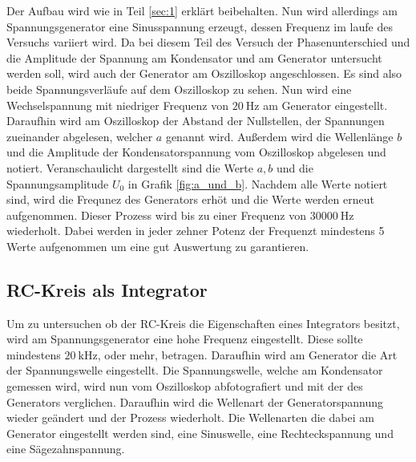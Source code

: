 Der Aufbau wird wie in Teil \ref{sec:1} erklärt beibehalten.
Nun wird allerdings am Spannungsgenerator eine Sinusspannung erzeugt, dessen Frequenz im laufe des Versuchs variiert wird.
Da bei diesem Teil des Versuch der Phasenunterschied und die Amplitude der Spannung am Kondensator und am Generator untersucht werden soll, wird auch der Generator am Oszilloskop angeschlossen.
Es sind also beide Spannungsverläufe auf dem Oszilloskop zu sehen.
Nun wird eine Wechselspannung mit niedriger Frequenz von $\SI{20}{\hertz}$ am Generator eingestellt.
Daraufhin wird am Oszilloskop der Abstand der Nullstellen, der Spannungen zueinander abgelesen, welcher $a$ genannt wird.
Außerdem wird die Wellenlänge $b$ und die Amplitude der Kondensatorspannung vom Oszilloskop abgelesen und notiert.
Veranschaulicht dargestellt sind die Werte $a, b$ und die Spannungsamplitude $U_0$ in Grafik \ref{fig:a_und_b}.
Nachdem alle Werte notiert sind, wird die Frequnez des Generators erhöt und die Werte werden erneut aufgenommen.
Dieser Prozess wird bis zu einer Frequenz von $\SI{30000}{\hertz}$ wiederholt. 
Dabei werden in jeder zehner Potenz der Frequenzt mindestens 5 Werte aufgenommen um eine gut Auswertung zu garantieren.


\subsection{RC-Kreis als Integrator}
Um zu untersuchen ob der RC-Kreis die Eigenschaften eines Integrators besitzt, wird am Spannungsgenerator eine hohe Frequenz eingestellt.
Diese sollte mindestens $\SI{20}{\kilo\hertz}$, oder mehr, betragen.
Daraufhin wird am Generator die Art der Spannungswelle eingestellt.
Die Spannungswelle, welche am Kondensator gemessen wird, wird nun vom Oszilloskop abfotografiert und mit der des Generators verglichen.
Daraufhin wird die Wellenart der Generatorspannung wieder geändert und der Prozess wiederholt.
Die Wellenarten die dabei am Generator eingestellt werden sind, eine Sinuswelle, eine Rechteckspannung und eine Sägezahnspannung.